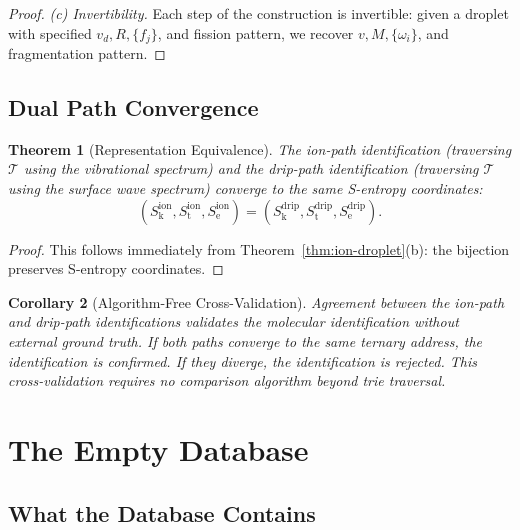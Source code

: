 \documentclass[11pt,twocolumn,a4paper]{article}
\newtheorem{theorem}{Theorem}[section]
\newtheorem{corollary}[theorem]{Corollary}
\theoremstyle{definition}
\theoremstyle{remark}
\newcommand{\Sk}{S_{\mathrm{k}}}
\newcommand{\St}{S_{\mathrm{t}}}
\newcommand{\Se}{S_{\mathrm{e}}}
\newcommand{\Trie}{\mathcal{T}}
\begin{document}
\begin{proof}
\emph{(c) Invertibility.} Each step of the construction is invertible: given a droplet with specified $v_d, R, \{f_j\}$, and fission pattern, we recover $v, M, \{\omega_i\}$, and fragmentation pattern.
\end{proof}

\subsection{Dual Path Convergence}
\label{sec:dual-convergence}

\begin{theorem}[Representation Equivalence]
\label{thm:representation-equivalence}
The ion-path identification (traversing $\Trie$ using the vibrational spectrum) and the drip-path identification (traversing $\Trie$ using the surface wave spectrum) converge to the same S-entropy coordinates:
\[
  (\Sk^{\mathrm{ion}}, \St^{\mathrm{ion}}, \Se^{\mathrm{ion}}) = (\Sk^{\mathrm{drip}}, \St^{\mathrm{drip}}, \Se^{\mathrm{drip}}).
\]
\end{theorem}

\begin{proof}
This follows immediately from Theorem~\ref{thm:ion-droplet}(b): the bijection preserves S-entropy coordinates.
\end{proof}

\begin{corollary}[Algorithm-Free Cross-Validation]
\label{cor:cross-validation}
Agreement between the ion-path and drip-path identifications validates the molecular identification without external ground truth. If both paths converge to the same ternary address, the identification is confirmed. If they diverge, the identification is rejected. This cross-validation requires no comparison algorithm beyond trie traversal.
\end{corollary}

\section{The Empty Database}
\label{sec:empty-database}

\subsection{What the Database Contains}
\label{sec:what-it-contains}
\end{document}
